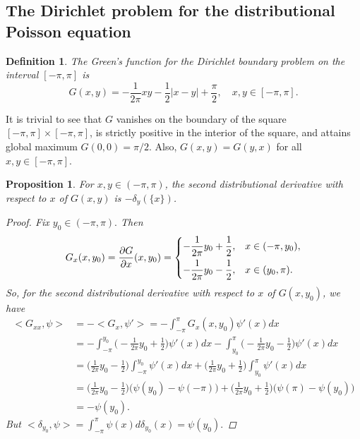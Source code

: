 \documentclass[11pt]{amsart}
\newtheorem{proposition}[theorem]{Proposition}
\newtheorem{definition}[theorem]{Definition}
\numberwithin{equation}{section}
\begin{document}
\subsection{The Dirichlet problem for the distributional Poisson equation}
\begin{definition}\textnormal{
The Green's function for the Dirichlet boundary problem on the interval \([-\pi,\pi]\)
is 
\begin{equation}\label{Green}
G(x,y)=-\frac{1}{2\pi}xy-\frac{1}{2}|x-y|+\frac{\pi}{2},\quad x,y\in[-\pi,\pi].
\end{equation}}
\end{definition}
It is trivial to see that \(G\) vanishes on the boundary of the square \([-\pi,\pi]\times[-\pi,\pi]\), is strictly positive in the interior of the square, and attains global maximum \(G(0,0)=\pi/2.\) Also, \(G(x,y)=G(y,x)\) for all \(x,y\in[-\pi,\pi].\)
\begin{proposition}\label{G distonos}
For \(x,y\in(-\pi,\pi)\), the second distributional derivative with respect to \(x\) of \(G(x,y)\) is \(-\delta_y(\{x\})\).
\begin{proof}
Fix \(y_0\in(-\pi,\pi).\) Then
\[G_x(x,y_0)=\frac{\partial G}{\partial x}(x,y_0)=
\begin{dcases}
-\frac{1}{2\pi}y_0+\frac{1}{2}, & x\in(-\pi,y_0),\\
-\frac{1}{2\pi}y_0-\frac{1}{2}, & x\in(y_0,\pi).
\end{dcases}\]
So, for the second distributional derivative with respect to \(x\) of \(G(x,y_0)\), we have
\begin{align*}
<G_{xx},\psi>&=-<G_x,\psi'>=-\int_{-\pi}^\pi G_x(x,y_0)\psi'(x)dx\\
&=-\int_{-\pi}^{y_0}\bigl(-\frac{1}{2\pi}y_0+\frac{1}{2}\bigr)\psi'(x)dx-\int^{\pi}_{y_0}\bigl(-\frac{1}{2\pi}y_0-\frac{1}{2}\bigr)\psi'(x)dx\\
&=\bigl(\frac{1}{2\pi}y_0-\frac{1}{2}\bigr)\int_{-\pi}^{y_0} \psi'(x)dx+\bigl(\frac{1}{2\pi}y_0+\frac{1}{2}\bigr)\int_{y_0}^\pi\psi'(x)dx\\
&=\bigl(\frac{1}{2\pi}y_0-\frac{1}{2}\bigr)\bigl(\psi(y_0)-\psi(-\pi)\bigr)+\bigl(\frac{1}{2\pi}y_0+\frac{1}{2}\bigr)\bigl(\psi(\pi)-\psi(y_0)\bigr)\\
&=-\psi(y_0).
\end{align*}
But \(\displaystyle<\delta_{y_0},\psi>=\int_{-\pi}^\pi \psi(x)d\delta_{y_0}(x)=\psi(y_0).\)
\end{proof}
\end{proposition}
\end{document}
